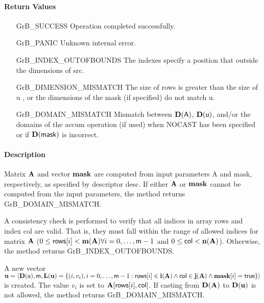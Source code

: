 \paragraph{Return Values}

\begin{itemize}[leftmargin=2.1in]
\item[{\sf GrB\_SUCCESS}]             Operation completed successfully.
\item[{\sf GrB\_PANIC}]               Unknown internal error.
\item[{\sf GrB\_INDEX\_OUTOFBOUNDS}]  The indexes specify a position that outside the dimensions of src.
\item[{\sf GrB\_DIMENSION\_MISMATCH}] 
       The size of {\sf rows} is greater than the size of {\sf u} , 
       or the dimensions of the mask (if specified) do not match {\sf u}.
\item[{\sf GrB\_DOMAIN\_MISMATCH}]    Mismatch between $\bold{D}(\sf A)$, 
                                      $\bold{D}({\sf u})$, and/or the domains of the 
                                      {\sf accum} operation (if used) when {\sf NOCAST} has
                                      been specified or if $\bold{D}(\sf mask)$ is incorrect.
\end{itemize}

\paragraph{Description}

Matrix ${\bf A}$ and vector ${\bf mask}$ are computed from input
parameters {\sf A} and {\sf mask}, respectively, as specified by
descriptor {\sf desc}.  If either ${\bf A}$ or ${\bf mask}$
cannot be computed from the input parameters, the method returns {\sf
GrB\_DOMAIN\_MISMATCH}.

A consistency check is performed to verify that all indices in array
{\sf rows} and index {\sf col} are valid. That is, they must fall within the range of allowed
indices for matrix ${\bf A}$ ($0 \leq {\sf rows}[i] < \bold{m}({\bf A})
\forall i = 0,\ldots,{\sf m}-1$ and
$0 \leq {\sf col} < \bold{n}({\bf A})$).  Otherwise, the method returns {\sf
GrB\_INDEX\_OUTOFBOUNDS}.

A new vector ${\bf u} = \langle \bold{D}({\sf u}),{\sf m},
\bold{L}({\bf u}) = \{ (i,v_{i}), i = 0,\ldots,{\sf m}-1 : {\sf rows}[i]
\in \bold{i}({\bf A}) \wedge {\sf col} \in \bold{j}({\bf A}) \wedge {\bf mask}[i] = {\sf true} \} \rangle$
is created.  The value $v_{i}$ is set to ${\bf A}[{\sf rows}[i],{\sf col}]$. If
casting from $\bold{D}({\bf A})$ to $\bold{D}({\bf u})$ is not
allowed, the method returns {\sf GrB\_DOMAIN\_MISMATCH}.

